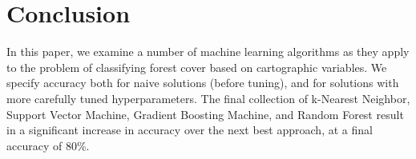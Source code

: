 \section{Conclusion}
\label{sec:-conc}

In this paper, we examine a number of machine learning algorithms as 
they apply to the problem of classifying forest cover based on 
cartographic variables.  We specify accuracy both for naive solutions 
(before tuning), and for solutions with more carefully tuned 
hyperparameters.  The final collection of k-Nearest Neighbor, Support 
Vector Machine, Gradient Boosting Machine, and Random Forest result in 
a significant increase in accuracy over the next best approach, at a 
final accuracy of 80\%.





